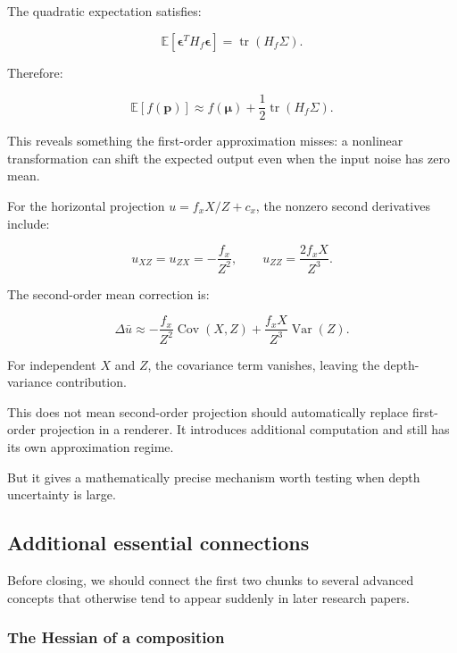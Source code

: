 The quadratic expectation satisfies:

\[
\mathbb E[ \boldsymbol\epsilon^TH_f\boldsymbol\epsilon ] = \operatorname{tr}(H_f\Sigma).
\]

Therefore:

\[
\boxed{ \mathbb E[f(\mathbf p)] \approx f(\boldsymbol\mu)+ \frac12\operatorname{tr}(H_f\Sigma) }.
\]

This reveals something the first-order approximation misses: a nonlinear transformation can shift the expected output even when the input noise has zero mean.

For the horizontal projection \(u=f_xX/Z+c_x\), the nonzero second derivatives include:

\[
u_{XZ}=u_{ZX}=-\frac{f_x}{Z^2}, \qquad u_{ZZ}=\frac{2f_xX}{Z^3}.
\]

The second-order mean correction is:

\[
\boxed{ \Delta\bar u \approx -\frac{f_x}{Z^2}\operatorname{Cov}(X,Z) + \frac{f_xX}{Z^3}\operatorname{Var}(Z) }.
\]

For independent \(X\) and \(Z\), the covariance term vanishes, leaving the depth-variance contribution.

This does not mean second-order projection should automatically replace first-order projection in a renderer. It introduces additional computation and still has its own approximation regime.

But it gives a mathematically precise mechanism worth testing when depth uncertainty is large.

\subsection{Additional essential connections}\label{02-foundations-ii-ch021-additional-essential-connections}

\hypertarget{02-foundations-ii-ch021-additional-essential-connections}{}

Before closing, we should connect the first two chunks to several advanced concepts that otherwise tend to appear suddenly in later research papers.

\subsubsection{The Hessian of a composition}\label{02-foundations-ii-ch021-the-hessian-of-a-composition}

\hypertarget{02-foundations-ii-ch021-the-hessian-of-a-composition}{}

